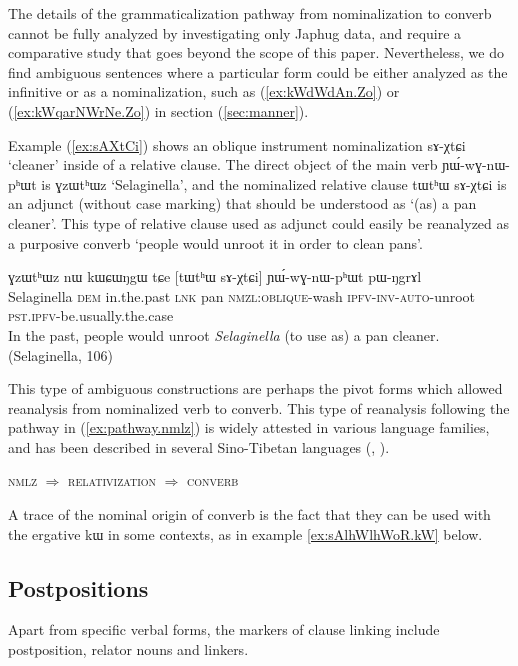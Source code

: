 \documentclass[oldfontcommands,oneside,a4paper,11pt]{article}
\newcommand{\ipa}[1]{{\phon \mbox{#1}}} %
\newcommand{\refb}[1]{(\ref{#1})}
\begin{document}
The details of the grammaticalization pathway from nominalization to converb cannot be fully analyzed by investigating only Japhug data, and require a comparative study that goes beyond the scope of this paper. Nevertheless, we do find ambiguous  sentences where a particular form could be either analyzed as the infinitive or as a nominalization, such as \refb{ex:kWdWdAn.Zo} or \refb{ex:kWqarNWrNe.Zo} in section \refb{sec:manner}. 

Example \refb{ex:sAXtCi} shows an oblique instrument nominalization \ipa{sɤ-χtɕi}  `cleaner' inside of a relative clause. The direct object of the main verb   	\ipa{ɲɯ́-wɣ-nɯ-pʰɯt} is \ipa{ɣzɯtʰɯz} `Selaginella', and the nominalized relative clause \ipa{tɯtʰɯ}  	\ipa{sɤ-χtɕi}  is an adjunct (without case marking) that should be understood as `(as) a pan cleaner'. This type of relative clause used as adjunct could easily be reanalyzed as a purposive converb `people would unroot it in order to clean pans'.

\begin{exe}
\ex \label{ex:sAXtCi}
\gll
\ipa{ɣzɯtʰɯz}  	\ipa{nɯ}  	\ipa{kɯɕɯŋgɯ}  	\ipa{tɕe}  	[\ipa{tɯtʰɯ}  	\ipa{sɤ-χtɕi}]  	\ipa{ɲɯ́-wɣ-nɯ-pʰɯt}  	\ipa{pɯ-ŋgrɤl}  \\
Selaginella \textsc{dem} in.the.past \textsc{lnk} pan \textsc{nmzl:oblique}-wash \textsc{ipfv-inv-auto}-unroot \textsc{pst.ipfv}-be.usually.the.case \\
\glt In the past, people would unroot \textit{Selaginella} (to use as) a pan cleaner. (Selaginella, 106)
\end{exe}

This type of ambiguous constructions are perhaps the pivot forms which allowed reanalysis from nominalized verb to converb. This type of reanalysis following the pathway in \refb{ex:pathway.nmlz} is widely attested in various language families, and has been described in several Sino-Tibetan languages (\citealt{coupe07mongsen}, \citealt{epps09converb}).

\begin{exe}
\ex \label{ex:pathway.nmlz}
\glt \textsc{nmlz} $\Rightarrow$  \textsc{relativization} $\Rightarrow$  \textsc{converb}  
\end{exe}

A trace of the nominal origin of converb is the fact that they can be used with the ergative \ipa{kɯ} in some contexts, as in example \ref{ex:sAlhWlhWoR.kW} below.

\subsection{Postpositions}  \label{sec:postp}
Apart from specific verbal forms, the markers of clause linking include postposition, relator nouns and linkers.
\end{document}

